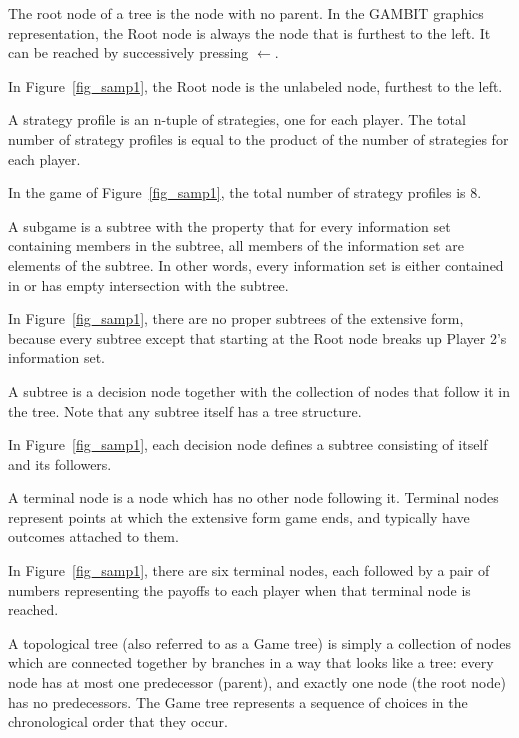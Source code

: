 \begin{helpglossary}
\label{rootnodegloss}
The root node of a tree is the node with no parent. In the GAMBIT graphics
representation, the Root node is always the node that is furthest to the
left.  It can be reached by successively pressing {\bf $\leftarrow$}. 

In Figure~\ref{fig_samp1}, the Root node is the unlabeled node, furthest to 
the left.

\label{stratprofgloss}
A strategy profile is an n-tuple of strategies, one for each player. The 
total number of strategy profiles is equal to the product of the number of 
strategies for each player. 
 
In the game of  Figure~\ref{fig_samp1}, the total number of strategy profiles
 is 8. 

\label{subgamegloss}
A subgame is a subtree with the property that for every information 
set containing members in the subtree, all members of the information 
set are elements of the subtree.  In other words, every information set 
is either contained in or has empty intersection with the subtree. 

In Figure~\ref{fig_samp1}, there are no proper subtrees of the extensive
form, because every subtree except that starting at the Root node breaks
up Player 2's information set.

\label{subtreegloss}
A subtree is a decision node together with the collection of nodes that
follow it in the tree.  Note that any subtree itself has a tree structure.

In Figure~\ref{fig_samp1}, each decision node defines a subtree consisting of itself
and its followers.   

\label{termnodegloss}
A terminal node is a node which has no other node following it.  Terminal 
nodes represent points at which the extensive form game ends, and typically 
have outcomes attached to them. 

In Figure~\ref{fig_samp1}, there are six terminal nodes, each followed by
a pair of numbers representing the payoffs to each player when that
terminal node is reached.

\label{toptreegloss}
A topological tree (also referred to as a Game tree) is simply a
collection of nodes which are connected together by branches in a way that
looks like a tree:  every node has at most one predecessor (parent), and exactly 
one node (the root node) has no predecessors.  
The Game tree represents a sequence of choices in the
chronological order that they occur.

\end{helpglossary} %



